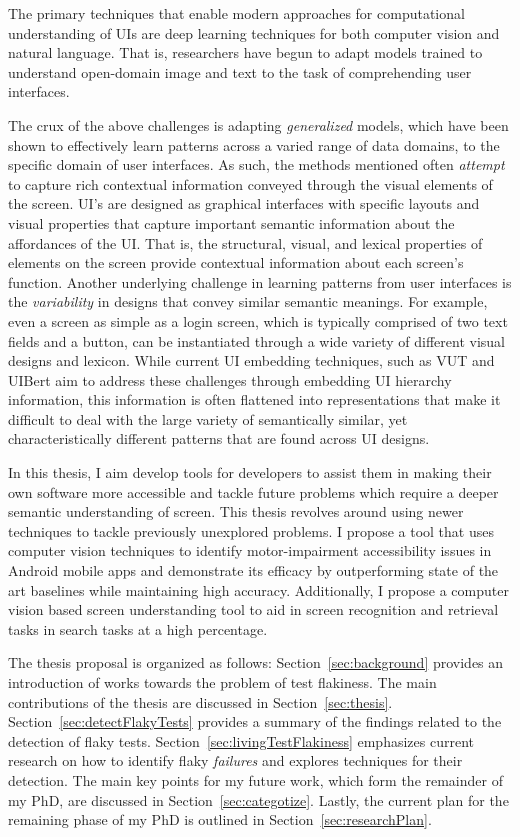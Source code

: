 The primary techniques that enable modern approaches for computational understanding of UIs are deep learning techniques for both computer vision and natural language. That is, researchers have begun to adapt models trained to understand open-domain image and text to the task of comprehending user interfaces. 

The crux of the above challenges is adapting \textit{generalized} models, which have been shown to effectively learn patterns across a varied range of data domains, to the specific domain of user interfaces. As such, the methods mentioned often \textit{attempt} to capture rich contextual information conveyed through the visual elements of the screen. UI's are designed as graphical interfaces with specific layouts and visual properties that capture important semantic information about the affordances of the UI. That is, the structural, visual, and lexical properties of elements on the screen provide contextual information about each screen's function. 
Another underlying challenge in learning patterns from user interfaces is the \textit{variability} in designs that convey similar semantic meanings. For example, even a screen as simple as a login screen, which is typically comprised of two text fields and a button, can be instantiated through a wide variety of different visual designs and lexicon. While current UI embedding techniques, such as VUT and UIBert aim to address these challenges through embedding UI hierarchy information, this information is often flattened into representations that make it difficult to deal with the large variety of semantically similar, yet characteristically different patterns that are found across UI designs.

In this thesis, I aim develop tools for developers to assist them in making their own software more accessible and tackle future problems which require a deeper semantic understanding of screen. This thesis revolves around using newer techniques to tackle previously unexplored problems. I propose a tool that uses computer vision techniques to identify motor-impairment accessibility issues in Android mobile apps and demonstrate its efficacy by outperforming state of the art baselines while maintaining high accuracy. Additionally, I propose a computer vision based screen understanding tool to aid in screen recognition and retrieval tasks in search tasks at a high percentage. 

The thesis proposal is organized as follows: Section~\ref{sec:background} provides an introduction of works towards the problem of test flakiness. The main contributions of the thesis are discussed in Section~\ref{sec:thesis}. Section~\ref{sec:detectFlakyTests} provides a summary of the findings related to the detection of flaky tests. Section~\ref{sec:livingTestFlakiness} emphasizes current research on how to identify flaky \emph{failures} and explores techniques for their detection. The main key points for my future work, which form the remainder of my PhD, are discussed in Section~\ref{sec:categotize}. Lastly, the current plan for the remaining phase of my PhD is outlined in Section~\ref{sec:researchPlan}.
